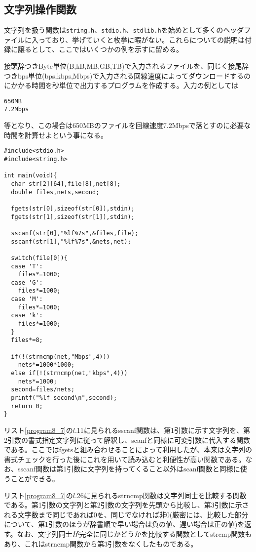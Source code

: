 \subsection{文字列操作関数}
文字列を扱う関数は\verb|string.h|、\verb|stdio.h|、\verb|stdlib.h|を始めとして多くのヘッダファイルに入っており、挙げていくと枚挙に暇がない。これらについての説明は付録に譲るとして、ここではいくつかの例を示すに留める。
\begin{boxnote}
\begin{multicols}{2}
接頭辞つきByte単位(B,kB,MB,GB,TB)で入力されるファイルを、同じく接尾辞つきbps単位(bps,kbps,Mbps)で入力される回線速度によってダウンロードするのにかかる時間を秒単位で出力するプログラムを作成する。入力の例としては
\begin{verbatim}
650MB
7.2Mbps
\end{verbatim}
等となり、この場合は650MBのファイルを回線速度7.2Mbpsで落とすのに必要な時間を計算せよという事になる。
\begin{lstlisting}[caption=ダウンロード時間の計算,label=program8_7]
#include<stdio.h>
#include<string.h>

int main(void){
  char str[2][64],file[8],net[8];
  double files,nets,second;
  
  fgets(str[0],sizeof(str[0]),stdin);
  fgets(str[1],sizeof(str[1]),stdin);

  sscanf(str[0],"%lf%7s",&files,file);
  sscanf(str[1],"%lf%7s",&nets,net);

  switch(file[0]){
  case 'T':
    files*=1000;
  case 'G':
    files*=1000;
  case 'M':
    files*=1000;  
  case 'k':
    files*=1000;  
  }
  files*=8;

  if(!(strncmp(net,"Mbps",4)))
    nets*=1000*1000;
  else if(!(strncmp(net,"kbps",4)))
    nets*=1000;
  second=files/nets;
  printf("%lf second\n",second);
  return 0;
}

\end{lstlisting}
\end{multicols}
\end{boxnote}
リスト\ref{program8_7}の$l$.11に見られるsscanf関数は、第1引数に示す文字列を、第2引数の書式指定文字列に従って解釈し、scanfと同様に可変引数に代入する関数である。ここではfgetsと組み合わせることによって利用したが、本来は文字列の書式チェックを行った後にこれを用いて読み込むと利便性が高い関数である。なお、sscanf関数は第1引数に文字列を持ってくること以外はscanf関数と同様に使うことができる。

リスト\ref{program8_7}の$l$.26に見られるstrncmp関数は文字列同士を比較する関数である。第1引数の文字列と第2引数の文字列を先頭から比較し、第3引数に示される文字数まで同じであれば0を、同じでなければ非0(厳密には、比較した部分について、第1引数のほうが辞書順で早い場合は負の値、遅い場合は正の値)を返す。なお、文字列同士が完全に同じかどうかを比較する関数としてstrcmp関数もあり、これはstrncmp関数から第3引数をなくしたものである。

